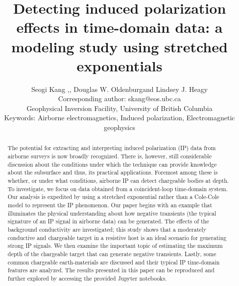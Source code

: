 \documentclass[manuscript]{geophysics}
\begin{document}
\title{Detecting induced polarization effects in time-domain data: a modeling study using stretched exponentials}

\renewcommand{\thefootnote}{\fnsymbol{footnote}}



\address{
\footnotemark[1]Geophyscial Inversion Facility, \\
University of British Columbia, Canada\\
BC, Vancouver}

\author{Seogi Kang \footnotemark[1],\footnotemark[2], Douglas W. Oldenburg\footnotemark[2] and Lindsey J. Heagy\footnotemark[2]\\[16pt]
{\normalfont \small
\footnotemark[1]
Corresponding author: skang@eos.ubc.ca \\
\footnotemark[2]
Geophysical Inversion Facility, University of British Columbia
}\\[16pt]
{
\normalfont \small
Keywords: Airborne electromagnetics, Induced polarization, Electromagnetic geophysics
}
}



\maketitle
\begin{abstract}
The potential for extracting and interpreting induced polarization (IP) data from airborne surveys is now broadly recognized. There is, however, still considerable discussion about the conditions under which the technique can provide knowledge about the subsurface and thus, its practical applications. Foremost among these is whether, or under what conditions, airborne IP can detect chargeable bodies at depth. To investigate, we focus on data obtained from a coincident-loop time-domain system. Our analysis is expedited by using a stretched exponential rather than a Cole-Cole model to represent the IP phenomenon. Our paper begins with an example that illuminates the physical understanding about how negative transients (the typical signature of an IP signal in airborne data) can be generated. The effects of the background conductivity are investigated; this study shows that a moderately conductive and chargeable target in a resistive host is an ideal scenario for generating strong IP signals. We then examine the important topic of estimating the maximum depth of the chargeable target that can generate negative transients. Lastly, some common chargeable earth-materials are discussed and their typical IP time-domain features are analyzed. The results presented in this paper can be reproduced and further explored by accessing the provided Jupyter notebooks.
\end{abstract}
\end{document}
